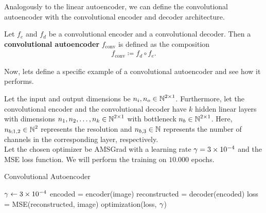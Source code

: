Analogously to the linear autoencoder, we can define the convolutional autoencoder with the convolutional encoder and decoder architecture.

\begin{definition}
Let $f_e$ and $f_d$ be a convolutional encoder and a convolutional decoder. Then a \textbf{convolutional autoencoder} $f_{\text{conv}}$ is defined as the composition
\begin{align*}
f_{\text{conv}} \coloneqq f_d \circ f_e.
\end{align*}
\end{definition}

Now, lets define a specific example of a convolutional autoencoder and see how it performs.

\begin{algorithm}
Let the input and output dimensions be $n_i, n_o \in \operatorname{\mathbb{N}}^{2\times 1}$. Furthermore, let the convolutional encoder and the convolutional decoder have $k$ hidden linear layers with dimensions $n_1, n_2,\ldots, n_k\in \operatorname{\mathbb{N}}^{2\times 1}$ with bottleneck $n_b\in\operatorname{\mathbb{N}}^{2\times 1}$. Here, $n_{b;1,2}\in\operatorname{\mathbb{N}}^{2}$ represents the resolution and $n_{b,3}\in\operatorname{\mathbb{N}}$ represents the number of channels in the corresponding layer, respectively.\\
Let the chosen optimizer be AMSGrad with a learning rate $\operatorname{\gamma}=\num{3e-4}$ and the MSE loss function. We will perform the training on $10.000$ epochs.
\caption{Convolutional Autoencoder}\label{alg:convolutional_AE}
\begin{algorithmic}[1]
\Require $\operatorname{\gamma} \gets \num{3e-4}$
	    \State encoded = encoder(image) 
		\State reconstructed = decoder(encoded) 
    	\State loss = MSE(reconstructed, image) 
	    \State optimization(loss, $\operatorname{\gamma}$) 
    \EndFor
\EndFor
\end{algorithmic}
\end{algorithm}


